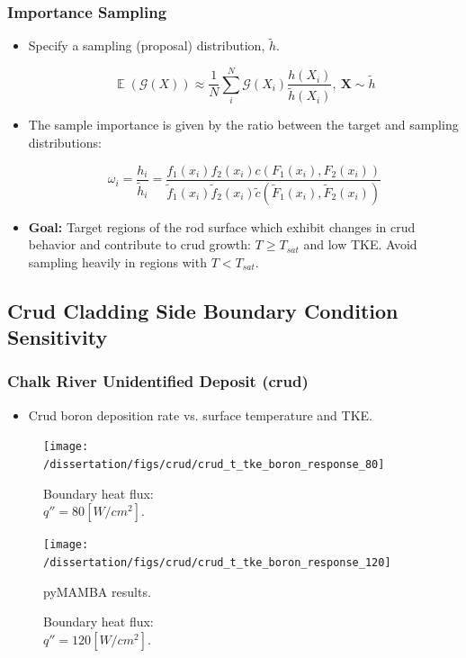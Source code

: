 \documentclass[t, pdftex]{beamer}
\DeclareMathOperator*{\E}{\mathbb{E}}
\begin{document}
\begin{frame}
\frametitle{Importance Sampling}
\vspace{-16pt}
\begin{itemize}
    \item Specify a sampling (proposal) distribution, $\tilde h$.

\begin{equation}
\E(\mathcal G(X)) \approx \frac{1}{N} \sum_i^N \mathcal G(X_i) \frac{h(X_i)}{\tilde h(X_i)}, \ \mathbf{X} \sim \tilde{h} \nonumber
\label{eq:mc_imp_expected_crud}
\end{equation}

\item The sample importance is given by the ratio between the target and sampling distributions:
    
    \begin{equation}
    \omega_i = \frac{h_i}{\tilde h_i} = \frac{f_1(x_i) f_2(x_i)c(F_1(x_i), F_2(x_i))}{\tilde f_1(x_i) \tilde f_2(x_i) \tilde c(\tilde F_1(x_i), \tilde F_2(x_i))} \nonumber
    \label{eq:imp_prob_ratio}
    \end{equation}

    \item \textbf{Goal:}  Target regions of the rod surface which exhibit changes in crud behavior and contribute to crud growth: $T \ge T_{sat}$ and low TKE.  Avoid sampling heavily in regions with $T<T_{sat}$.
\end{itemize}
\end{frame}

\subsection*{Crud Cladding Side Boundary Condition Sensitivity}
\begin{frame}
\frametitle{Chalk River Unidentified Deposit (crud)}
\vspace{-12pt}
\begin{itemize}
    \item Crud boron deposition rate vs. surface temperature and TKE.
\end{itemize}
\begin{figure}
    \centering
    \begin{minipage}{.5\textwidth}
        \centering
        \texttt{[image: /dissertation/figs/crud/crud\_t\_tke\_boron\_response\_80]}
        \caption{\centering Boundary heat flux: \\ $q''=80[W/cm^2]$.  }
    \end{minipage}%
    \begin{minipage}{.5\textwidth}
        \centering
        \texttt{[image: /dissertation/figs/crud/crud\_t\_tke\_boron\_response\_120]}
        \caption{\centering  Boundary heat flux: \\ $q''=120[W/cm^2]$. }
    \end{minipage}
    pyMAMBA results. 
\end{figure}
\end{frame}
\end{document}
